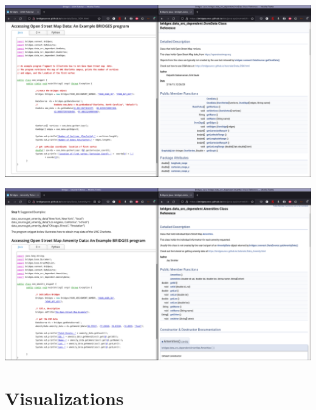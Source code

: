 \documentclass[aspectratio=169]{beamer}
\begin{document}
\begin{frame}
  \includegraphics[width=1.02\linewidth]{dataset_figs/OSMmap.png}
\end{frame}

\begin{frame}
  \includegraphics[width=1.02\linewidth]{dataset_figs/OSMAmenities.png}
\end{frame}

\section{Visualizations}
\end{document}
